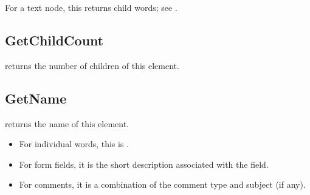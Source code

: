 \documentclass[letterpaper,12pt,english,openany,oneside]{sphinxmanual}
\begin{document}
For a text node, this returns child words; see .

\begin{sphinxVerbatim}[commandchars=\\\{\}]
      
\end{sphinxVerbatim}


\subsection{GetChildCount}
\label{\detokenize{Access_DOM:getchildcount}}
 returns the number of children of this element.

\begin{sphinxVerbatim}[commandchars=\\\{\}]
   
\end{sphinxVerbatim}


\subsection{GetName}
\label{\detokenize{Access_DOM:getname}}
 returns the name of this element.
\begin{itemize}
\item {} 
For individual words, this is  .

\item {} 
For form fields, it is the short description associated with the field.

\item {} 
For comments, it is a combination of the comment type and subject (if any).

\end{itemize}

\begin{sphinxVerbatim}[commandchars=\\\{\}]
   
\end{sphinxVerbatim}
\end{document}
